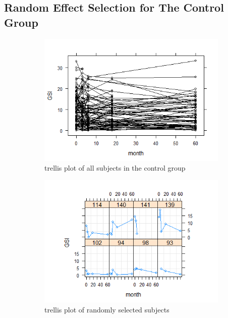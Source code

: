 \subsection{Random Effect Selection for The Control Group}
\begin{figure}[H]
\begin{subfigure}{.33\textwidth}
  \centering
  \includegraphics[width=1\linewidth]{../../plots/trellis_control.png}
  \caption{trellis plot of all subjects in the control group}
\end{subfigure}
\begin{subfigure}{.33\textwidth}
  \centering
  \includegraphics[width=1\linewidth]{../../plots/trellis_subset_control.png}
  \caption{trellis plot of randomly selected subjects}
\end{subfigure}
\begin{subfigure}{.33\textwidth}

\end{subfigure}
\end{figure}
